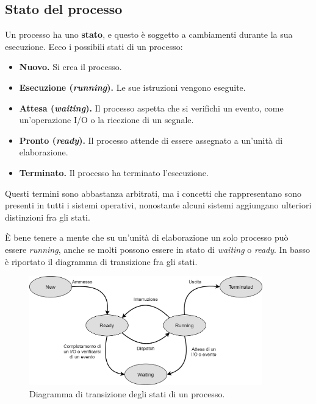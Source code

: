     \subsection{Stato del processo}
        Un processo ha uno \textbf{stato}, e questo è soggetto a cambiamenti durante la sua esecuzione. Ecco i possibili stati di un processo:
        \begin{itemize}
            \item \textbf{Nuovo.} Si crea il processo.
            \item \textbf{Esecuzione (\textit{running}).} Le sue istruzioni vengono eseguite.
            \item \textbf{Attesa (\textit{waiting}).} Il processo aspetta che si verifichi un evento, come un'operazione I/O o la ricezione di un segnale.
            \item \textbf{Pronto (\textit{ready}).} Il processo attende di essere assegnato a un'unità di elaborazione.
            \item \textbf{Terminato.} Il processo ha terminato l'esecuzione.
        \end{itemize}
        
        Questi termini sono abbastanza arbitrati, ma i concetti che rappresentano sono presenti in tutti i sistemi operativi, nonostante alcuni sistemi aggiungano ulteriori distinzioni fra gli stati.
        
        È bene tenere a mente che su un'unità di elaborazione un solo processo può essere \textit{running}, anche se molti possono essere in stato di \textit{waiting} o \textit{ready}. In basso è riportato il diagramma di transizione fra gli stati.
        
        \begin{figure}[h]
            \centering
            \includegraphics[width=0.9\textwidth]{img/img7.png}
            \caption{Diagramma di transizione degli stati di un processo.}
            \label{fig:img7}
        \end{figure}
        
